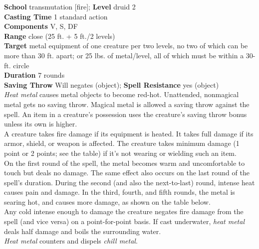 \textbf{School} transmutation [fire]; \textbf{Level} druid 2\\
\textbf{Casting Time} 1 standard action\\
\textbf{Components} V, S, DF\\
\textbf{Range} close (25 ft. + 5 ft./2 levels)\\
\textbf{Target }metal equipment of one creature per two levels, no two of which can be more than 30 ft. apart; or 25 lbs. of metal/level, all of which must be within a 30-ft. circle\\
\textbf{Duration} 7 rounds \\
\textbf{Saving Throw }Will negates (object); \textbf{Spell Resistance} yes (object)\\
\textit{Heat metal }causes metal objects to become red-hot. Unattended, nonmagical metal gets no saving throw. Magical metal is allowed a saving throw against the spell. An item in a creature's possession uses the creature's saving throw bonus unless its own is higher.\\
A creature takes fire damage if its equipment is heated. It takes full damage if its armor, shield, or weapon is affected. The creature takes minimum damage (1 point or 2 points; see the table) if it's not wearing or wielding such an item.\\
On the first round of the spell, the metal becomes warm and uncomfortable to touch but deals no damage. The same effect also occurs on the last round of the spell's duration. During the second (and also the next-to-last) round, intense heat causes pain and damage. In the third, fourth, and fifth rounds, the metal is searing hot, and causes more damage, as shown on the table below.\\
Any cold intense enough to damage the creature negates fire damage from the spell (and vice versa) on a point-for-point basis. If cast underwater, \textit{heat metal }deals half damage and boils the surrounding water.\\
\textit{Heat metal }counters and dispels \textit{chill metal}.\\
